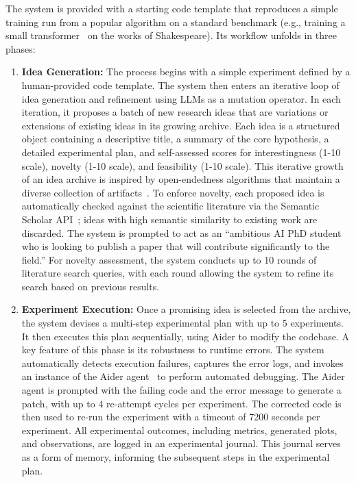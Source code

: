 The system is provided with a starting code template that reproduces a simple training run from a popular algorithm on a standard benchmark (e.g., training a small transformer~\citep{vaswani2017attention} on the works of Shakespeare). Its workflow unfolds in three phases:
\begin{enumerate}
    \item \textbf{Idea Generation:} The process begins with a simple experiment defined by a human-provided code template. The system then enters an iterative loop of idea generation and refinement using LLMs as a mutation operator. In each iteration, it proposes a batch of new research ideas that are variations or extensions of existing ideas in its growing archive. Each idea is a structured object containing a descriptive title, a summary of the core hypothesis, a detailed experimental plan, and self-assessed scores for interestingness (1-10 scale), novelty (1-10 scale), and feasibility (1-10 scale). This iterative growth of an idea archive is inspired by open-endedness algorithms that maintain a diverse collection of artifacts~\citep{stanley2017open, lehman2022evolutionlargemodels}. To enforce novelty, each proposed idea is automatically checked against the scientific literature via the Semantic Scholar API~\citep{fricke2018semantic}; ideas with high semantic similarity to existing work are discarded. The system is prompted to act as an ``ambitious AI PhD student who is looking to publish a paper that will contribute significantly to the field.'' For novelty assessment, the system conducts up to 10 rounds of literature search queries, with each round allowing the system to refine its search based on previous results.
    
    \item \textbf{Experiment Execution:} Once a promising idea is selected from the archive, the system devises a multi-step experimental plan with up to 5 experiments. It then executes this plan sequentially, using Aider to modify the codebase. A key feature of this phase is its robustness to runtime errors. The system automatically detects execution failures, captures the error logs, and invokes an instance of the Aider agent~\citep{aider} to perform automated debugging. The Aider agent is prompted with the failing code and the error message to generate a patch, with up to 4 re-attempt cycles per experiment. The corrected code is then used to re-run the experiment with a timeout of 7200 seconds per experiment. All experimental outcomes, including metrics, generated plots, and observations, are logged in an experimental journal. This journal serves as a form of memory, informing the subsequent steps in the experimental plan.
    

\end{enumerate}

